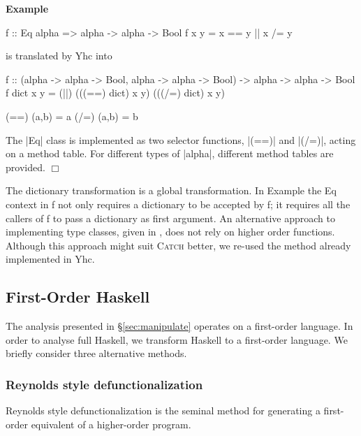 \documentclass[preprint]{sigplanconf}
\newcommand{\C}[1]{\textsf{#1}}
\newcommand{\catch}{\textsc{Catch}}
\newcounter{exmp}
\newcommand{\yesexample}{\addtocounter{exmp}{1}\addvspace{2mm}\noindent\textbf{Example \arabic{exmp}}}
\newcommand{\noexample}{\hfill\ensuremath{\Box}\par\addvspace{2mm}}
\newcommand{\lastexample}{\arabic{exmp}}
\newenvironment{example}{\yesexample}{\noexample}
\newcommand{\ignore}{}
\begin{document}
\begin{example}
\nopagebreak
\ignore\begin{code}
f :: Eq alpha => alpha -> alpha -> Bool
f x y = x == y || x /= y
\end{code}

\noindent is translated by Yhc into

\begin{code}
f :: (alpha -> alpha -> Bool, alpha -> alpha -> Bool) -> alpha -> alpha -> Bool
f dict x y = (||) (((==) dict) x y) (((/=) dict) x y)

(==) (a,b) = a
(/=) (a,b) = b
\end{code}

The |Eq| class is implemented as two selector functions, |(==)| and |(/=)|, acting on a method table. For different types of |alpha|, different method tables are provided.
\end{example}

The dictionary transformation is a global transformation. In Example \lastexample{} the \C{Eq} context in \C{f} not only requires a dictionary to be accepted by \C{f}; it requires all the callers of \C{f} to pass a dictionary as first argument. An alternative approach to implementing type classes, given in \citet{jones:dictionary_free}, does not rely on higher order functions. Although this approach might suit \catch{} better, we re-used the method already implemented in Yhc.

\subsection{First-Order Haskell}

The analysis presented in \S\ref{sec:manipulate} operates on a first-order language. In order to analyse full Haskell, we transform Haskell to a first-order language. We briefly consider three alternative methods.

\subsubsection{Reynolds style defunctionalization}

Reynolds style defunctionalization \citep{reynolds:defunc} is the seminal method for generating a first-order equivalent of a higher-order program.
\end{document}

